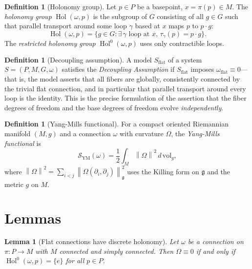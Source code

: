 \documentclass[12pt]{amsart}
\theoremstyle{plain}
\newtheorem{lemma}[theorem]{Lemma}
\theoremstyle{definition}
\newtheorem{definition}[theorem]{Definition}
\DeclareMathOperator{\Hol}{Hol}
\newcommand{\fg}{\mathfrak{g}}
\newcommand{\norm}[1]{\left\lVert #1 \right\rVert}
\newcommand{\dVol}{d\,\mathrm{vol}_g}
\begin{document}
\begin{definition}[Holonomy group]
Let $p \in P$ be a basepoint, $x = \pi(p) \in M$. The \emph{holonomy group}
$\Hol(\omega, p)$ is the subgroup of $G$ consisting of all $g \in G$ such
that parallel transport around some loop $\gamma$ based at $x$ maps $p$ to
$p \cdot g$:
\[
  \Hol(\omega, p) = \{g \in G : \exists\, \gamma \text{ loop at } x,
  \, \tau_\gamma(p) = p \cdot g\}.
\]
The \emph{restricted holonomy group} $\Hol^0(\omega,p)$ uses only
contractible loops.
\end{definition}

\begin{definition}[Decoupling assumption]
\label{def:decoupling}
A model $S_{\mathrm{flat}}$ of a system $S = (P, M, G, \omega)$ satisfies
the \emph{Decoupling Assumption} if $S_{\mathrm{flat}}$ imposes
$\omega_{\mathrm{flat}} \equiv 0$---that is, the model asserts that all
fibers are globally, consistently connected by the trivial flat connection,
and in particular that parallel transport around every loop is the identity.
This is the precise formulation of the assertion that the fiber degrees of
freedom and the base degrees of freedom evolve \emph{independently}.
\end{definition}

\begin{definition}[Yang-Mills functional]
\label{def:YM}
For a compact oriented Riemannian manifold $(M, g)$ and a connection
$\omega$ with curvature $\Omega$, the \emph{Yang-Mills functional} is
\[
  \mathcal{S}_{\mathrm{YM}}(\omega) = \frac{1}{2}\int_M \norm{\Omega}^2\,
  \dVol,
\]
where $\norm{\Omega}^2 = \sum_{i<j} \norm{\Omega(\partial_i,
\partial_j)}_{\fg}^2$ uses the Killing form on $\fg$ and the metric $g$ on
$M$.
\end{definition}

\section{Lemmas}
\label{sec:lemmas}

\begin{lemma}[Flat connections have discrete holonomy]
\label{lem:flat-holonomy}
Let $\omega$ be a connection on $\pi: P \to M$ with $M$ connected and
simply connected. Then $\Omega \equiv 0$ if and only if $\Hol^0(\omega, p) =
\{e\}$ for all $p \in P$.
\end{lemma}
\end{document}

